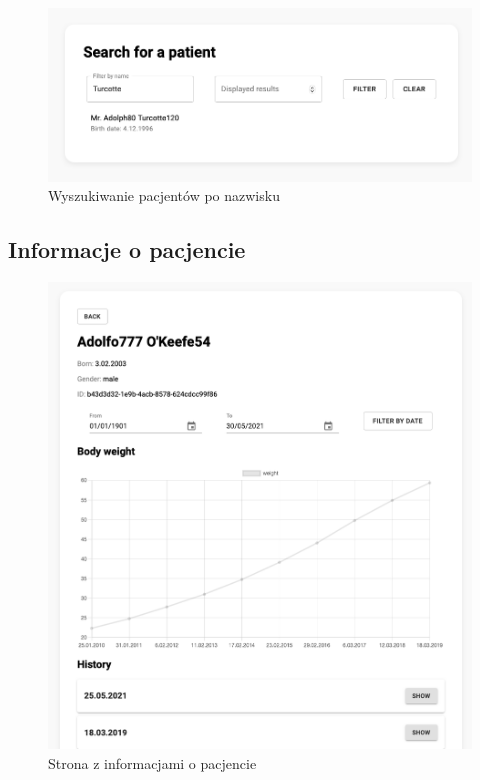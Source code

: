 \documentclass[polish,polish,a4paper]{article}
\begin{document}
	\begin{figure}[!h]
		\centering
		\includegraphics[width=.8\linewidth]{img/list2.png}
		\caption{Wyszukiwanie pacjentów po nazwisku}
	\end{figure}
	
	\newpage
	\subsection{Informacje o pacjencie}
	
	\begin{figure}[!h]
		\centering
		\includegraphics[width=.8\linewidth]{img/patient1.png}
		\caption{Strona z informacjami o pacjencie}
	\end{figure}
	
	\newpage
	
\end{document}
